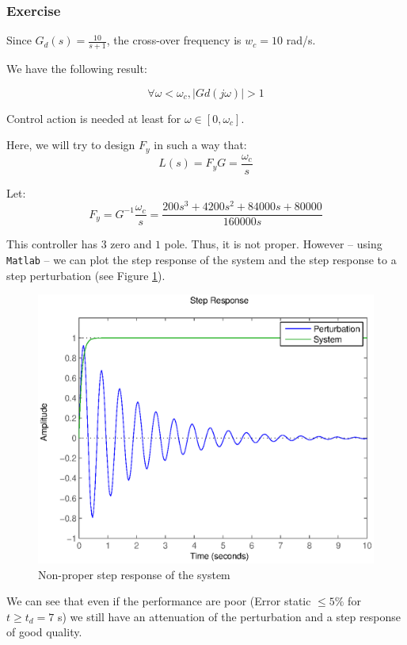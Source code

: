\subsubsection{Exercise}

Since $G_d(s) = \frac{10}{s+1}$, the cross-over frequency is $w_c = 10$ rad/s.

We have the following result:

$$\forall \omega < \omega_c, |Gd(j\omega)| >1$$

Control action is needed at least for $\omega \in [0,\omega_c]$.

Here, we will try to design $F_y$ in such a way that:
$$L(s) = F_y G = \frac{\omega_c}{s}$$

Let:
$$F_y = G^{-1} \frac{\omega_c}{s} = \frac{200 s^3 + 4200 s^2 + 84000 s + 80000}{160000 s}$$

This controller has $3$ zero and $1$ pole. Thus, it is not proper. However -- using \texttt{Matlab} -- we can plot the step response of the system and the step response to a step perturbation (see Figure \ref{stepNonProper}).

\begin{figure}[h!t]
    \centering
    \includegraphics[width=\linewidth]{fig/stepNonProper421.eps}
    \caption{Non-proper step response of the system}
    \label{stepNonProper}
\end{figure}

We can see that even if the performance are poor (Error static $\leq 5\%$ for $t \geq t_d = 7$ s) we still have an attenuation of the perturbation and a step response of good quality.


